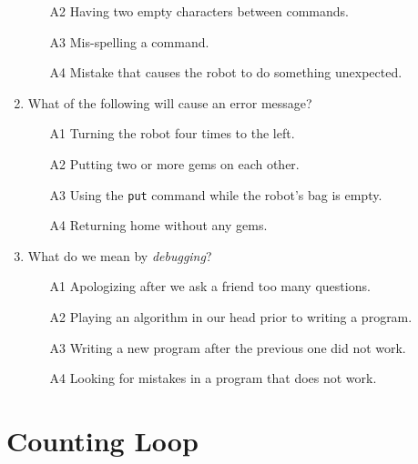 \begin{enumerate}
\begin{enumerate}
\item[A2] Having two empty characters between commands.
\item[A3] Mis-spelling a command.  
\item[A4] Mistake that causes the robot to do something unexpected.
\end{enumerate}
\item What of the following will cause an error message?
\begin{enumerate}
\item[A1] Turning the robot four times to the left.
\item[A2] Putting two or more gems on each other.
\item[A3] Using the {\tt put} command while the robot's bag is empty.
\item[A4] Returning home without any gems.
\end{enumerate}
\item What do we mean by {\em debugging}?
\begin{enumerate}
\item[A1] Apologizing after we ask a friend too many questions.
\item[A2] Playing an algorithm in our head prior to writing a program. 
\item[A3] Writing a new program after the previous one did not work.
\item[A4] Looking for mistakes in a program that does not work.
\end{enumerate}
\end{enumerate}


\section{Counting Loop}

